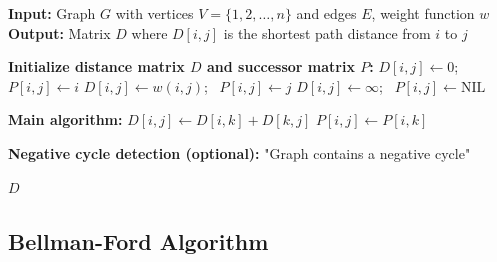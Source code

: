 \documentclass{article}
\theoremstyle{definition}
\begin{document}
\begin{algorithm}
\caption{Floyd-Warshall Algorithm}
\begin{algorithmic}[1]
    \State \textbf{Input:} Graph $G$ with vertices $V = \{1, 2, \ldots, n\}$ and edges $E$, weight function $w$
    \State \textbf{Output:} Matrix $D$ where $D[i,j]$ is the shortest path distance from $i$ to $j$
    
    \State \textbf{Initialize distance matrix $D$ and successor matrix $P$:}
                \State $D[i,j] \gets 0$; \ $P[i,j] \gets i$
                \State $D[i,j] \gets w(i,j)$; \ $P[i,j] \gets j$ 
            \Else
                \State $D[i,j] \gets \infty$; \ $P[i,j] \gets \text{NIL}$
            \EndIf
        \EndFor
    \EndFor
    
    \State \textbf{Main algorithm:}
                    \State $D[i,j] \gets D[i,k] + D[k,j]$
                    \State $P[i,j] \gets P[i,k]$ 
                \EndIf
            \EndFor
        \EndFor
    \EndFor
    
    \State \textbf{Negative cycle detection (optional):}
            \State \Return "Graph contains a negative cycle"
        \EndIf
    \EndFor
    
    \State \Return $D$ 
\EndProcedure
\end{algorithmic}
\end{algorithm}


\pagebreak
\newpage

\subsection{Bellman-Ford Algorithm}
\end{document}
